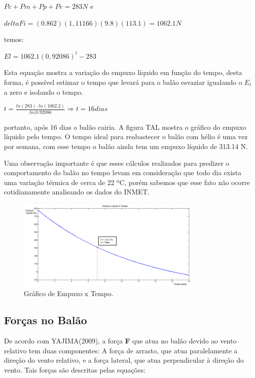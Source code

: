 	 $Pc + Pm + Pp+Pe = 283 N$   e

	 $deltaFi = (0.862)(1,11166)(9.8)(113.1) = 1062.1 N$

	temos:

	 $El = 1062.1(0,92086)^t - 283$

	Esta equação mostra a variação do empuxo líquido em função do tempo, desta forma, é possível estimar o tempo que levará para o balão esvaziar igualando o $E_l$ a zero e isolando o tempo.

	$t = \frac{ln(283) – ln(1062.2)}{ln(0.92086} \Rightarrow t = 16 dias$

	portanto, após 16 dias o balão cairia. A figura TAL mostra o gráfico do empuxo líquido pelo tempo. O tempo ideal para reabastecer o balão com hélio é uma vez por semana, com esse tempo o balão ainda tem um empuxo líquido de 313.14 N.

	Uma observação importante é que esses cálculos realizados para predizer o comportamento do balão no tempo levam em consideração que todo dia exista uma variação térmica de cerca de 22 ºC, porém sabemos que esse fato não ocorre cotidianamente analisando os dados do INMET.


	\begin{figure}[H]
		\centering
		\includegraphics[width=0.8\textwidth]{figuras/empuxoLiquidoTempo}
		\caption{Gráfico de Empuxo x Tempo.}
		\label{img:empuxoLiquidoTempo}
	\end{figure}

\subsection{Forças no Balão} %
\label{sub:for_as_no_bal_o}

De acordo com YAJIMA(2009), a força \textbf{F} que atua no balão devido ao vento relativo tem duas componentes: A força de arrasto, que atua paralelamente a direção do vento relativo, e a força lateral, que atua perpendicular à direção do vento.
Tais forças são descritas pelas equações:

